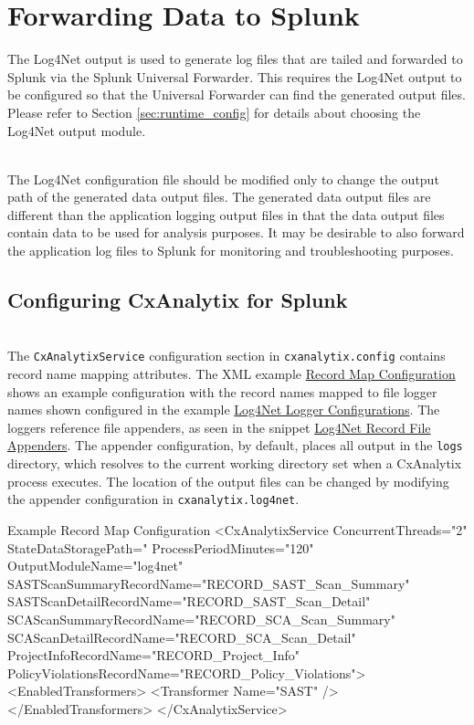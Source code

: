 \chapter{Forwarding Data to Splunk}\label{chap:splunk_config}

The Log4Net output is used to generate log files that are tailed and forwarded to Splunk via the Splunk Universal Forwarder.  This requires the Log4Net
output to be configured so that the Universal Forwarder can find the generated output files.  Please refer to Section \ref{sec:runtime_config} for details
about choosing the Log4Net output module.

\noindent\\The Log4Net configuration file should be modified only to change the output path of the generated data output files.  The generated data output files are different
than the application logging output files in that the data output files contain data to be used for analysis purposes. It may be desirable to also forward
the application log files to Splunk for monitoring and troubleshooting purposes.


\section{Configuring CxAnalytix for Splunk}

\noindent\\The \texttt{CxAnalytixService} configuration section in \texttt{cxanalytix.config} contains record name mapping attributes.  The XML example 
\hyperref[lst:record_map]{Record Map Configuration}
shows an example configuration with the record names mapped to file logger names shown configured in the example 
\hyperref[lst:record_loggers]{Log4Net Logger Configurations}.  The loggers
reference file appenders, as seen in the snippet \hyperref[lst:record_appenders]{Log4Net Record File Appenders}.  The appender configuration, 
by default, places all output in the \texttt{logs}
directory, which resolves to the current working directory set when a CxAnalytix process executes.  The location of the output files can be changed
by modifying the appender configuration in \texttt{cxanalytix.log4net}.



\begin{code}{Example Record Map Configuration}{\label{lst:record_map}}{}
<CxAnalytixService 
    ConcurrentThreads="2" 
    StateDataStoragePath="%
    ProcessPeriodMinutes="120"
    OutputModuleName="log4net"
    SASTScanSummaryRecordName="RECORD_SAST_Scan_Summary"
    SASTScanDetailRecordName="RECORD_SAST_Scan_Detail"
    SCAScanSummaryRecordName="RECORD_SCA_Scan_Summary"
    SCAScanDetailRecordName="RECORD_SCA_Scan_Detail"
    ProjectInfoRecordName="RECORD_Project_Info"
    PolicyViolationsRecordName="RECORD_Policy_Violations">
    <EnabledTransformers>
        <Transformer Name="SAST" />
    </EnabledTransformers>
</CxAnalytixService>
\end{code}


